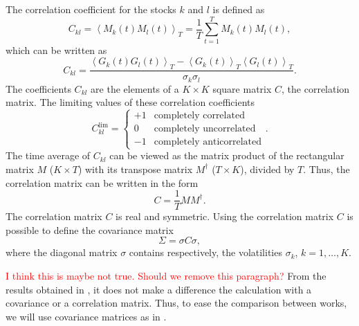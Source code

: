 The correlation coefficient for the stocks $k$ and $l$ is defined as
\cite{non_stationarity_fin_guhr}
\begin{equation}
    C_{kl} = \left\langle M_{k} \left( t \right) M_{l} \left( t \right)
    \right\rangle_{T} = \frac{1}{T} \sum_{t=1}^{T} M_{k} \left( t \right) M_{l}
    \left( t \right),
\end{equation}
which can be written as
\begin{equation}
    C_{kl} = \frac{\left\langle G_{k} \left( t \right) G_{l} \left( t \right)
    \right\rangle_{T} - \left\langle G_{k} \left( t \right) \right\rangle_{T}
    \left\langle G_{l} \left( t \right) \right\rangle_{T}}
    {\sigma_{k} \sigma_{l}}.
\end{equation}
The coefficients $C_{kl}$ are the elements of a $K \times K$ square matrix $C$,
the correlation matrix. The limiting values of these correlation coefficients
\begin{equation}
    C_{kl}^{\text{lim}} =
    \left\{
    \begin{array}{cc}
    +1 & \text{completely correlated}  \\
    0  & \text{completely uncorrelated}\\
    -1 & \text{completely anticorrelated}
    \end{array}
    \right. .
\end{equation}
The time average of $C_{kl}$ can be viewed as the matrix product of the
rectangular matrix $M$ ($K \times T$) with its transpose matrix $M^{\dagger}$
($T \times K$), divided by $T$. Thus, the correlation matrix can be written in
the form
\begin{equation}
    C = \frac{1}{T} M M^{\dagger}.
\end{equation}
The correlation matrix $C$ is real and symmetric. Using the correlation matrix
$C$ is possible to define the covariance matrix
\cite{exact_distributions_guhr,credit_risk_guhr,portfolio_distributions_guhr,asset_correlations_guhr,stochastic_cov_guhr}
\begin{equation}
    \Sigma = \sigma C \sigma ,
\end{equation}
where the diagonal matrix $\sigma$ contains respectively, the volatilities
$\sigma_{k}$, $k = 1, \ldots, K$.

\textcolor{red}{I think this is maybe not true. Should we remove this
paragraph?}
From the results obtained in
\cite{non_stationarity_fin_guhr,portfolio_distributions_guhr}, it does not make
a difference the calculation with a covariance or a correlation matrix. Thus,
to ease the comparison between works, we will use covariance matrices as in
\cite{non_stationarity_fin_guhr}.

